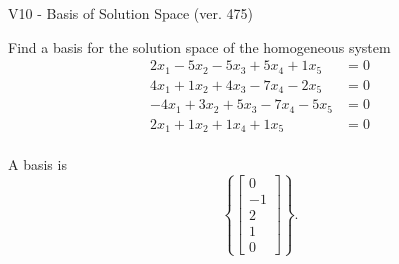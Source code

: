 \begin{exercise}
  \begin{exerciseTitle}V10 - Basis of Solution Space (ver. 475)\end{exerciseTitle}
  \begin{exerciseStatement}
    Find a basis for the solution space of the homogeneous system 
\begin{align*}
 2 x_ 1 -5 x_ 2 -5 x_ 3 + 5 x_ 4 + 1 x_ 5 &= 0  \\ 
  4 x_ 1 + 1 x_ 2 + 4 x_ 3 -7 x_ 4 -2 x_ 5 &= 0  \\ 
  -4 x_ 1 + 3 x_ 2 + 5 x_ 3 -7 x_ 4 -5 x_ 5 &= 0  \\ 
  2 x_ 1 + 1 x_ 2 + 1 x_ 4 + 1 x_ 5 &= 0  \\ 
 \end{align*}


 
  \end{exerciseStatement}

  \begin{exerciseAnswer}
   A basis is   
\[\left\{\left[\begin{array}{c}
0 \\
-1 \\
2 \\
1 \\
0
\end{array}\right]\right\}.\]

  


  \end{exerciseAnswer}
\end{exercise}